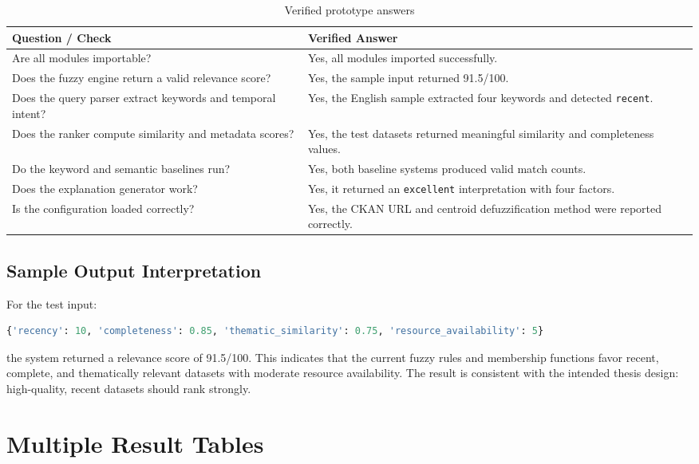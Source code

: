 \documentclass[11pt,a4paper]{article}
\begin{document}
\begin{table}[H]
\centering
\begin{tabular}{p{} p{}}
\toprule
\textbf{Question / Check} & \textbf{Verified Answer} \\
\midrule
Are all modules importable? & Yes, all modules imported successfully. \\
Does the fuzzy engine return a valid relevance score? & Yes, the sample input returned 91.5/100. \\
Does the query parser extract keywords and temporal intent? & Yes, the English sample extracted four keywords and detected \texttt{recent}. \\
Does the ranker compute similarity and metadata scores? & Yes, the test datasets returned meaningful similarity and completeness values. \\
Do the keyword and semantic baselines run? & Yes, both baseline systems produced valid match counts. \\
Does the explanation generator work? & Yes, it returned an \texttt{excellent} interpretation with four factors. \\
Is the configuration loaded correctly? & Yes, the CKAN URL and centroid defuzzification method were reported correctly. \\
\bottomrule
\end{tabular}
\caption{Verified prototype answers}
\end{table}

\subsection{Sample Output Interpretation}

For the test input:

\begin{lstlisting}[language=Python]
{'recency': 10, 'completeness': 0.85, 'thematic_similarity': 0.75, 'resource_availability': 5}
\end{lstlisting}

the system returned a relevance score of 91.5/100. This indicates that the current fuzzy rules and membership functions favor recent, complete, and thematically relevant datasets with moderate resource availability. The result is consistent with the intended thesis design: high-quality, recent datasets should rank strongly.

\section{Multiple Result Tables}
\end{document}
